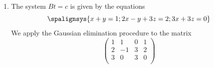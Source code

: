 \documentclass[11.0pt]{exam}
\begin{document}
\begin{questions}
\begin{solution}
\begin{enumerate}
\[\begin{pmatrix}
0 & 0 & 1
\end{pmatrix}\]
which gives us
\[C=\begin{pmatrix}
0 & 1 & 0\\
2 & 0 & 3\\
3 & 0 & 2
\end{pmatrix}^{-1}.\]
The determinant of this matrix is 5 and its cofactor matrix is 
\[\begin{pmatrix}
0 & 5 & 0\\
-2 & 0 & 3\\
3 & 0 & -2
\end{pmatrix}.\]
Hence, the inverse is
\[C=\frac{1}{5}\begin{pmatrix}
0 & -2 & 3\\
5 & 0 & 0\\
0 & 3 & -2
\end{pmatrix}.\]
\item The system $Bt=c$ is given by the equations 
\[
  \spalignsys{
x+y=1 ;
2x-y+3z=2 ;
3x+3z=0
}
\]
We apply the Gaussian elimination procedure to the matrix
\[
\left(\begin{array}{ccc|c}
    1 & 1 & 0 & 1 \\
    2 & -1 & 3 & 2 \\
    3 & 0 & 3 & 0 \\
\end{array}\right)
\]


\end{enumerate}
\end{solution}
\end{questions}
\end{document}
